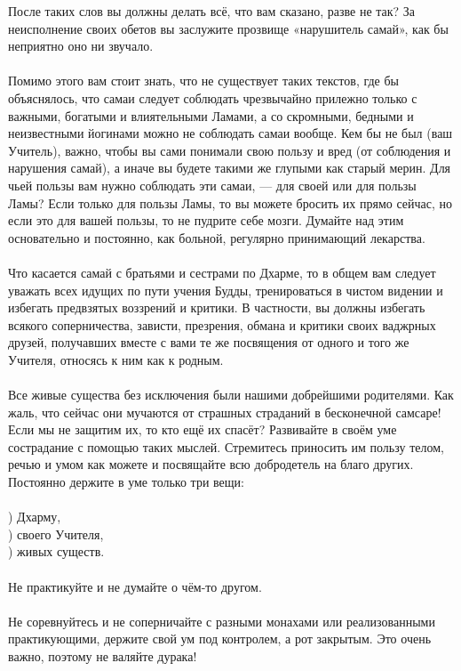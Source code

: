 После таких слов вы должны делать всё, что вам сказано,
разве не так? За неисполнение своих обетов вы заслужите
прозвище «нарушитель самай», как бы неприятно оно ни звучало.\\
\\
Помимо этого вам стоит знать, что не существует таких текстов,
где бы объяснялось, что самаи следует соблю\-дать чрезвычайно
прилежно только с важными, богатыми и влиятельными Ламами,
а со скромными, бедными и неизвестными йогинами можно не
соблюдать самаи вообще. Кем бы не был (ваш Учитель), важно,
чтобы вы сами понимали свою пользу и вред (от соблюдения и
нарушения самай), а иначе вы будете такими же глупыми как
старый мерин. Для чьей пользы вам нужно соблюдать эти самаи,
— для своей или для пользы Ламы? Если только для пользы Ламы,
то вы можете бросить их прямо сейчас, но если это для вашей
пользы, то не пудрите себе мозги. Думайте над этим основательно
и постоянно, как больной, регулярно принимающий лекарства.\\
\\
Что касается самай с братьями и сестрами по Дхарме, то в
общем вам следует уважать всех идущих по пути учения Будды,
тренироваться в чистом видении и избегать предвзятых воззрений
и критики. В частности, вы должны избегать всякого соперничества,
зависти, презрения, обмана и критики своих ваджрных друзей,
получавших вместе с вами те же посвящения от одного и того
же Учителя, относясь к ним как к родным.\\
\\
\newpage
Все живые существа без исключения были нашими добрейши\-ми
родителями. Как жаль, что сейчас они мучаются от страшных
страданий в бесконечной самсаре! Если мы не защитим их,
то кто ещё их спасёт? Развивайте в своём уме сострадание
с помощью таких мыслей. Стремитесь приносить им пользу телом,
речью и умом как можете и посвящайте всю добродетель на благо других.
Постоянно держите в уме только три вещи:\\
\\
) Дхарму,\\
) своего Учителя,\\
) живых существ.\\
\\
Не практикуйте и не думайте о чём-то другом.\\
\\
Не соревнуйтесь и не соперничайте с разными монахами
или реализованными практикующими, держите свой ум под контролем,
а рот закрытым. Это очень важно, поэтому не валяйте дурака!
